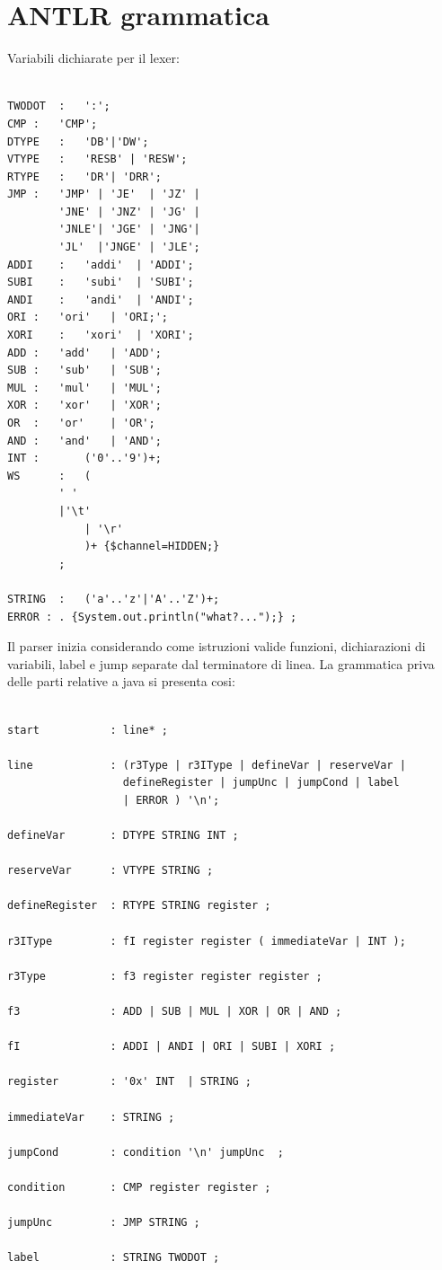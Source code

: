 \section{ANTLR grammatica}
Variabili dichiarate per il lexer:
\begin{lstlisting}[style=ANTLR,caption=lexer]
    
TWODOT	:	':';
CMP	:	'CMP';
DTYPE	:	'DB'|'DW';
VTYPE	:	'RESB' | 'RESW';
RTYPE	:	'DR'| 'DRR';
JMP	:	'JMP' | 'JE'  | 'JZ' | 
		'JNE' | 'JNZ' | 'JG' | 
		'JNLE'| 'JGE' | 'JNG'| 
		'JL'  |'JNGE' | 'JLE';
ADDI	:	'addi'	| 'ADDI';
SUBI	:	'subi'	| 'SUBI';
ANDI	:	'andi'	| 'ANDI';
ORI	:	'ori'	| 'ORI;';
XORI	:	'xori'  | 'XORI'; 
ADD	:	'add' 	| 'ADD';
SUB	:	'sub' 	| 'SUB';
MUL	:	'mul'	| 'MUL';
XOR	:	'xor'	| 'XOR';
OR	:	'or' 	| 'OR';
AND	:	'and' 	| 'AND';
INT	:    	('0'..'9')+;
WS      :   (
        ' '
        |'\t'
            | '\r'
            )+ {$channel=HIDDEN;}
        ;

STRING	:	('a'..'z'|'A'..'Z')+;
ERROR : . {System.out.println("what?...");} ;
\end{lstlisting}
\newpage
Il parser inizia considerando come istruzioni valide funzioni, dichiarazioni di variabili, label e jump separate dal terminatore di linea.
La grammatica priva delle parti relative a java si presenta cosi: 
\begin{lstlisting}[style=ANTLR,caption=parser]
    
start           : line* ;

line            : (r3Type | r3IType | defineVar | reserveVar | 
                  defineRegister | jumpUnc | jumpCond | label
                  | ERROR ) '\n';

defineVar       : DTYPE STRING INT ;
	
reserveVar      : VTYPE STRING ;
    
defineRegister	: RTYPE STRING register ;

r3IType	        : fI register register ( immediateVar | INT );

r3Type      	: f3 register register register ;

f3              : ADD | SUB | MUL | XOR | OR | AND ;

fI              : ADDI | ANDI | ORI | SUBI | XORI ; 

register        : '0x' INT  | STRING ;
		
immediateVar    : STRING ;

jumpCond        : condition '\n' jumpUnc  ;

condition       : CMP register register ;

jumpUnc         : JMP STRING ;
	
label 	        : STRING TWODOT ;
\end{lstlisting}
